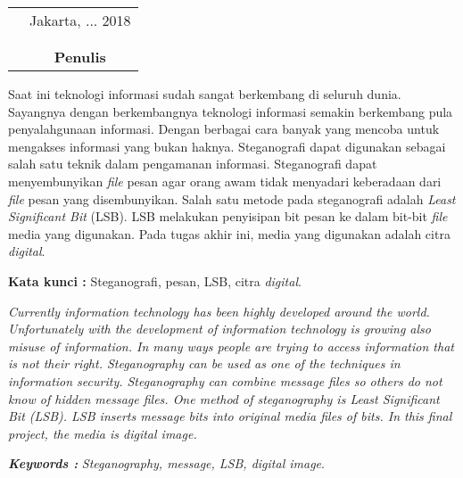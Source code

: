 \documentclass{jtetiskripsi}
\begin{document}
\begin{tabular}{p{7.5cm}c}
	&Jakarta, ... 2018\\
	&\\
	&\\
	&\textbf{Penulis}
\end{tabular}


\tableofcontents 
{}
\listoffigures
{}
\listoftables
{}

\begin{abstractind}
	Saat ini teknologi informasi sudah sangat berkembang di seluruh dunia. Sayangnya dengan berkembangnya teknologi informasi semakin berkembang pula penyalahgunaan informasi. Dengan berbagai cara banyak yang mencoba untuk mengakses informasi yang bukan haknya. Steganografi dapat digunakan sebagai salah satu teknik dalam pengamanan informasi. Steganografi dapat menyembunyikan \emph{file} pesan agar orang awam tidak menyadari keberadaan dari \emph{file} pesan yang disembunyikan. Salah satu metode pada steganografi adalah \emph{Least Significant Bit} (LSB). LSB melakukan penyisipan bit pesan ke dalam bit-bit \emph{file} media yang digunakan. Pada tugas akhir ini, media yang digunakan adalah citra \emph{digital}.
	
	\bigskip
	\noindent
	\textbf{Kata kunci :} Steganografi, pesan, LSB, citra \emph{digital}.
\end{abstractind}

\begin{abstracteng}
	\textit{Currently information technology has been highly developed around the world. Unfortunately with the development of information technology is growing also misuse of information. In many ways people are trying to access information that is not their right. Steganography can be used as one of the techniques in information security. Steganography can combine message files so others do not know of hidden message files. One method of steganography is Least Significant Bit (LSB). LSB inserts message bits into original media files of bits. In this final project, the media is digital image.}    
	
	\bigskip
	\noindent
	\textbf{\emph{Keywords :}} \emph{Steganography, message, LSB, digital image}.
\end{abstracteng}
\begin{counterpage}
\end{counterpage}

\end{document}
